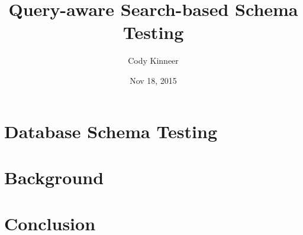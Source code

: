 \documentclass[hyperref]{beamer}
\title{Query-aware Search-based Schema Testing}
\author[Kinneer]{Cody Kinneer}
\institute[Allegheny College 2015]{Allegheny 2015}
\date[Nov 9, 2015]{Nov 18, 2015}
\begin{document}
\begin{frame}
  \titlepage
\end{frame}

\section{Database Schema Testing}


\section{Background}


\begin{comment}
\section{Query-aware Schema Testing}


\section{Experiment Design}


\section{Results}


\end{comment}

\section{Conclusion}

\end{document}
